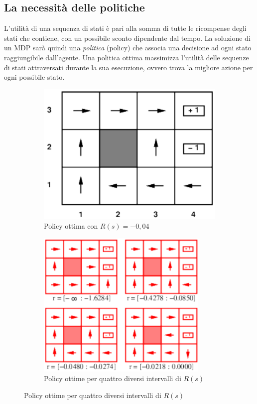 \documentclass[11pt,oneside]{book}
\begin{document}
\subsection{La necessità delle politiche}
L'utilità di una sequenza di stati è pari alla somma di tutte le ricompense degli stati che contiene, con un possibile sconto dipendente dal tempo. La soluzione di un MDP sarà quindi una \textit{politica} (policy) che associa una decisione ad ogni stato raggiungibile dall'agente. Una politica ottima massimizza l'utilità delle sequenze di stati attraversati durante la sua esecuzione, ovvero trova la migliore azione per ogni possibile stato.
\begin{figure}[htp]
	\begin{subfigure}{0.49\textwidth}
	    \centering
		\includegraphics[width=\textwidth, height=\textheight, keepaspectratio]{policy1.png}
		\caption{Policy ottima con $R(s)=-0,04$}
	\end{subfigure}
	\hfill
	\begin{subfigure}{0.49\textwidth}
	    \centering
		\includegraphics[width=0.9\textwidth]{policy2.png}
		\caption{Policy ottime per quattro diversi intervalli di $R(s)$}
	\end{subfigure}
\end{figure}
\end{document}
